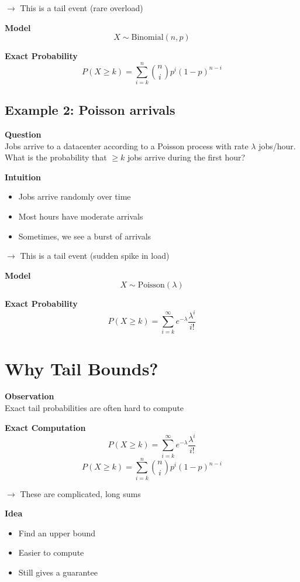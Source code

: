 \documentclass[12pt]{article}
\begin{document}
$\rightarrow$ This is a tail event (rare overload)

\textbf{Model}
\[
X \sim \text{Binomial}(n, p)
\]

\textbf{Exact Probability}
\[
P(X \geq k) = \sum_{i=k}^{n} \binom{n}{i} p^i (1-p)^{n-i}
\]

\subsection{Example 2: Poisson arrivals}

\textbf{Question}\\
Jobs arrive to a datacenter according to a Poisson process with rate $\lambda$ jobs/hour.\\
What is the probability that $\geq k$ jobs arrive during the first hour?

\textbf{Intuition}
\begin{itemize}
    \item Jobs arrive randomly over time
    \item Most hours have moderate arrivals
    \item Sometimes, we see a burst of arrivals
\end{itemize}

$\rightarrow$ This is a tail event (sudden spike in load)

\textbf{Model}
\[
X \sim \text{Poisson}(\lambda)
\]

\textbf{Exact Probability}
\[
P(X \geq k) = \sum_{i=k}^{\infty} e^{-\lambda} \frac{\lambda^i}{i!}
\]

\section{Why Tail Bounds?}

\textbf{Observation}\\
Exact tail probabilities are often hard to compute

\textbf{Exact Computation}
\[
P(X \geq k) = \sum_{i=k}^{\infty} e^{-\lambda} \frac{\lambda^i}{i!}
\]
\[
P(X \geq k) = \sum_{i=k}^{n} \binom{n}{i} p^i (1-p)^{n-i}
\]

$\rightarrow$ These are complicated, long sums

\textbf{Idea}
\begin{itemize}
    \item Find an upper bound
    \item Easier to compute
    \item Still gives a guarantee
\end{itemize}
\end{document}
